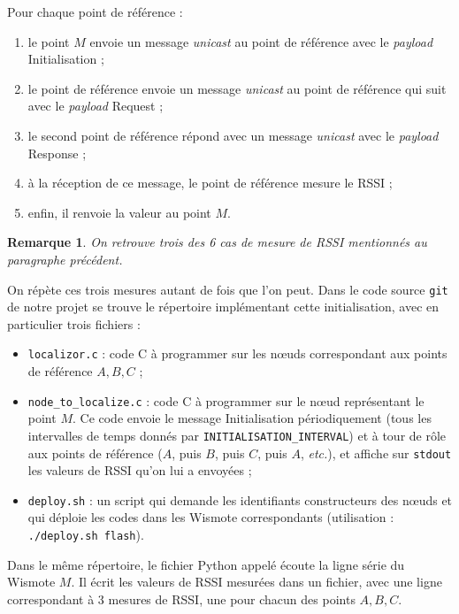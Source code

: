\documentclass[french, a4paper, 12pt, parskip]{scrartcl}
\newtheorem*{remark}{Remarque}
\begin{document}
Pour chaque point de référence :
\begin{enumerate}
  \item le point $M$ envoie un message \textit{unicast} au point de référence
    avec le \textit{payload} \og{}Initialisation\fg{} ; 
  \item le point de référence envoie un message \textit{unicast} au point de
    référence qui suit avec le \textit{payload} \og{}Request\fg{} ; 
  \item le second point de référence répond avec un message \textit{unicast}
    avec le \textit{payload} \og{}Response\fg{} ; 
  \item à la réception de ce message, le point de référence mesure le RSSI ; 
  \item enfin, il renvoie la valeur au point $M$. 
\end{enumerate}

\begin{remark}
  On retrouve trois des 6 cas de mesure de RSSI mentionnés au paragraphe
  précédent.
\end{remark}

On répète ces trois mesures autant de fois que l'on peut. Dans le code source
\verb+git+ de notre projet se trouve le répertoire
 implémentant cette initialisation, avec en
particulier trois fichiers :
\begin{itemize}
  \item \verb+localizor.c+ : code C à programmer sur les nœuds correspondant
    aux points de référence $A, B, C$ ;
  \item \verb+node_to_localize.c+ : code C à programmer sur le nœud
    représentant le point $M$. Ce code envoie le message
    \og{}Initialisation\fg{} périodiquement (tous les intervalles de temps
    donnés par \verb+INITIALISATION_INTERVAL+) et à tour de rôle aux points de
    référence ($A$, puis $B$, puis $C$, puis $A$, \textit{etc.}), et affiche
    sur \verb+stdout+ les valeurs de RSSI qu'on lui a envoyées ;
  \item \verb+deploy.sh+ : un script qui demande les identifiants constructeurs
    des nœuds et qui déploie les codes dans les Wismote correspondants
    (utilisation : \verb+./deploy.sh flash+).
\end{itemize}

Dans le même répertoire, le fichier Python appelé
 écoute la ligne série du Wismote $M$. Il écrit
les valeurs de RSSI mesurées dans un fichier, avec une ligne correspondant à 3
mesures de RSSI, une pour chacun des points $A, B, C$.
\end{document}
